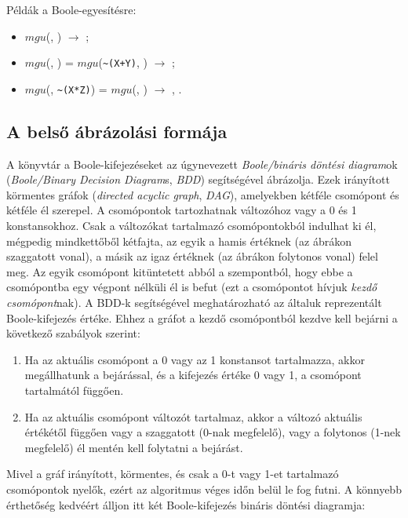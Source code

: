 Példák a Boole-egyesítésre:

\begin{itemize}
\item $mgu$(, ) $\longrightarrow$ ;
\item $mgu$(, ) = $mgu$(\verb'~(X+Y)', )
$\longrightarrow$ ;
\item $mgu$(, \verb'~(X*Z)') = $mgu$(, )
$\longrightarrow$ , .
\end{itemize}

\subsection{A \clpb belső ábrázolási formája}

A \clpb könyvtár a Boole-kifejezéseket az úgynevezett \emph{Boole/bináris
döntési diagram}ok (\emph{Boole/Binary Decision Diagram}s, \emph{BDD})
segítségével ábrázolja. Ezek irányított körmentes gráfok (\emph{directed
acyclic graph}, \emph{DAG}), amelyekben kétféle csomópont és kétféle él
szerepel. A csomópontok tartozhatnak változóhoz vagy a 0 és 1 konstansokhoz.
Csak a változókat tartalmazó csomópontokból indulhat ki él, mégpedig
mindkettőből kétfajta, az egyik a hamis értéknek (az ábrákon szaggatott vonal),
a másik az igaz értéknek (az ábrákon folytonos vonal) felel meg. Az egyik
csomópont kitüntetett abból a szempontból, hogy ebbe a csomópontba egy
végpont nélküli él is befut (ezt a csomópontot hívjuk \emph{kezdő csomópont}nak).
A BDD-k segítségével meghatározható az általuk reprezentált Boole-kifejezés
értéke. Ehhez a gráfot a kezdő csomópontból kezdve kell bejárni a
következő szabályok szerint:

\begin{enumerate}
\item Ha az aktuális csomópont a 0 vagy az 1 konstansot tartalmazza, akkor
megállhatunk a bejárással, és a kifejezés értéke 0 vagy 1, a csomópont
tartalmától függően.
\item Ha az aktuális csomópont változót tartalmaz, akkor a változó aktuális
értékétől függően vagy a szaggatott (0-nak megfelelő), vagy a folytonos
(1-nek megfelelő) él mentén kell folytatni a bejárást.
\end{enumerate}

Mivel a gráf irányított, körmentes, és csak a 0-t vagy 1-et tartalmazó
csomópontok nyelők, ezért az algoritmus véges időn belül le fog futni.
A könnyebb érthetőség kedvéért álljon itt két Boole-kifejezés bináris döntési
diagramja:

